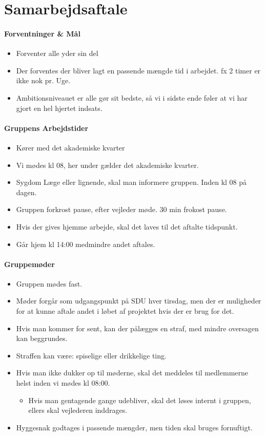 \section{Samarbejdsaftale}
\paragraph{Forventninger \& Mål}
\begin{itemize}
    \item Forventer alle yder sin del
    \item Der forventes der bliver lagt en passende mængde tid i arbejdet. fx 2 timer er ikke nok pr. Uge.
    \item Ambitionsniveauet er alle gør sit bedste, så vi i sidste ende føler at vi har gjort en hel hjertet indsats.
\end{itemize}

\paragraph{Gruppens Arbejdstider}
\begin{itemize}
    \item Kører med det akademiske kvarter
    \item Vi mødes kl 08, her under gælder det akademiske kvarter.
    \item Sygdom Læge eller lignende, skal man informere gruppen. Inden kl 08 på dagen.
    \item Gruppen forkrost pause, efter vejleder møde. 30 min frokost pause.
    \item Hvis der gives hjemme arbejde, skal det laves til det aftalte tidspunkt.
    \item Går hjem kl 14:00 medmindre andet aftales.
\end{itemize}

\paragraph{Gruppemøder}
\begin{itemize}
    \item Gruppen mødes fast.
    \item Møder forgår som udgangspunkt på SDU hver tirsdag, men der er muligheder for at kunne aftale andet i løbet af projektet hvis der er brug for det.
    \item Hvis man kommer for sent, kan der pålægges en straf, med mindre oversagen kan beggrundes.
    \item Straffen kan være: spiselige eller drikkelige ting. 
    \item Hvis man ikke dukker op til møderne, skal det meddeles til medlemmerne helst inden vi mødes kl 08:00.
	\begin{itemize}
	    \item Hvis man gentagende gange udebliver, skal det løses internt i gruppen, ellers skal vejlederen inddrages.
	\end{itemize}
    \item Hyggesnak godtages i passende mængder, men tiden skal bruges fornuftigt.
\end{itemize}

